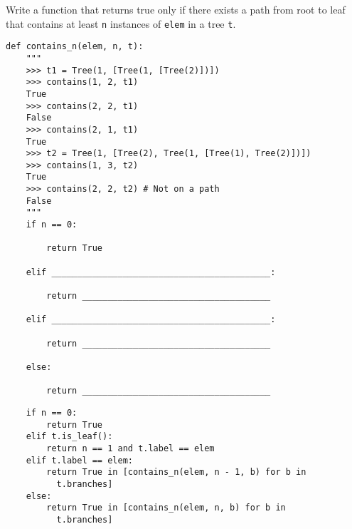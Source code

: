 \begin{blocksection}
\question Write a function that returns true only if there exists a path from root to leaf that contains at least \lstinline$n$ instances of \lstinline$elem$ in a tree \lstinline$t$.

\begin{lstlisting}
def contains_n(elem, n, t):
    """
    >>> t1 = Tree(1, [Tree(1, [Tree(2)])])
    >>> contains(1, 2, t1)
    True
    >>> contains(2, 2, t1)
    False
    >>> contains(2, 1, t1)
    True
    >>> t2 = Tree(1, [Tree(2), Tree(1, [Tree(1), Tree(2)])])
    >>> contains(1, 3, t2)
    True
    >>> contains(2, 2, t2) # Not on a path
    False
    """
    if n == 0:
		
        return True
				
    elif ___________________________________________:
		
        return _____________________________________
				
    elif ___________________________________________:
		
        return _____________________________________
				
    else:
		
        return _____________________________________
\end{lstlisting}
\end{blocksection}
\begin{blocksection}
\begin{solution}
\begin{lstlisting}
    if n == 0:
        return True
    elif t.is_leaf():
        return n == 1 and t.label == elem
    elif t.label == elem:
        return True in [contains_n(elem, n - 1, b) for b in     
          t.branches]
    else:
        return True in [contains_n(elem, n, b) for b in 
          t.branches]
\end{lstlisting}
\end{solution}
\end{blocksection}
